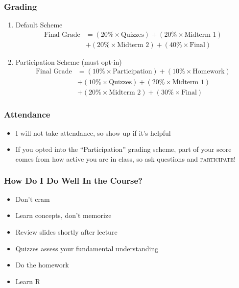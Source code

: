 \documentclass{beamer}
\begin{document}
\begin{frame}
\frametitle{Grading}
	\begin{enumerate}
		\item \alert{Default Scheme}
			\begin{align*}
			\text{Final Grade} &= (20\% \times \text{Quizzes}) + (20\% \times \text{Midterm 1})  
			\\
			&+ (20\% \times \text{Midterm 2}) + (40\% \times \text{Final})
			\end{align*}
		\item \alert{Participation Scheme (must opt-in)}
			\begin{align*}
			\text{Final Grade} &= (10\% \times \text{Participation}) + (10\% \times \text{Homework})
			\\
			&+ (10\% \times \text{Quizzes}) + (20\% \times \text{Midterm 1}) 
			\\
			&+ (20\% \times \text{Midterm 2}) + (30\% \times \text{Final})
			\end{align*}
	\end{enumerate}
\end{frame}

\begin{frame}
\frametitle{Attendance}
	\begin{itemize}
		\item I will not take attendance, so show up if it's helpful
		\item If you opted into the ``Participation'' grading scheme, part of your score comes from 			how active you are in class, so ask questions and \alert{\textsc{participate}}!
	\end{itemize}
\end{frame}

\begin{frame}
\frametitle{How Do I Do Well In the Course?}
	\begin{itemize}[<+- | alert@+>]
		\item Don't cram
		\item Learn concepts, don't memorize
		\item Review slides shortly after lecture
		\item Quizzes assess your fundamental understanding
		\item Do the homework
		\item Learn R\alert<7>{\only<7>{, seriously.}}
	\end{itemize}
\end{frame}
\end{document}
